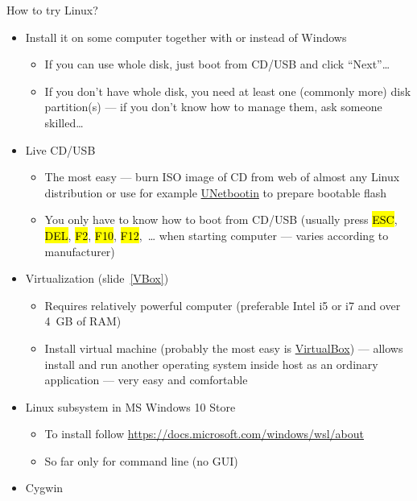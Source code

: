 \documentclass[compress, ucs, xelatex, 11pt, xcolor=svgnames,
  hyperref={
    bookmarks=true,
    unicode=true,
    colorlinks=true,
    pdftitle={Linux, command line and MetaCentrum},
    plainpages=false,
    pdfauthor={Vojtech Zeisek},
    pdfsubject={Course about use of Linux command line, writing shell scripts and using MetaCentrum of CESNET},
    pdfcreator={XeLaTeX},
    pdfkeywords={Linux, GNU, BASH, shell, command line, MetaCentrum},
    linkcolor=DarkRed,
    anchorcolor=DarkBlue,
    citecolor=Indigo,
    filecolor=NavyBlue,
    menucolor=DarkMagenta,
    urlcolor=DarkBlue,
    pdftex},
  url={hyphens, lowtilde} %
  ]{beamer}
\renewcommand{\texttt}[1]{\hl{\ttfamily #1}}
\begin{document}

\begin{frame}[allowframebreaks]{How to try Linux?}
  \begin{itemize}
    \item Install it on some computer together with or instead of Windows
    \begin{itemize}
      \item If you can use whole disk, just boot from CD/USB and click ``Next''\ldots
      \item If you don't have whole disk, you need at least one (commonly more) disk partition(s) --- if you don't know how to manage them, ask someone skilled\ldots
    \end{itemize}
    \item Live CD/USB
    \begin{itemize}
      \item The most easy --- burn ISO image of CD from web of almost any Linux distribution or use for example \href{https://unetbootin.github.io/}{UNetbootin} to prepare bootable flash
      \item You only have to know how to boot from CD/USB (usually press \texttt{ESC}, \texttt{DEL}, \texttt{F2}, \texttt{F10}, \texttt{F12},~\ldots{ }when starting computer --- varies according to manufacturer)
    \end{itemize}
    \item Virtualization (slide~\ref{VBox})
    \begin{itemize}
      \item Requires relatively powerful computer (preferable Intel i5 or i7 and over 4~GB of RAM)
      \item Install virtual machine (probably the most easy is \href{https://www.virtualbox.org/}{VirtualBox}) --- allows install and run another operating system inside host as an ordinary application --- very easy and comfortable
    \end{itemize}
    \item Linux subsystem in MS Windows 10 Store
    \begin{itemize}
      \item To install follow \url{https://docs.microsoft.com/windows/wsl/about}
      \item So far only for command line (no GUI)
    \end{itemize}
    \item Cygwin

\end{itemize}
\end{frame}
\end{document}
